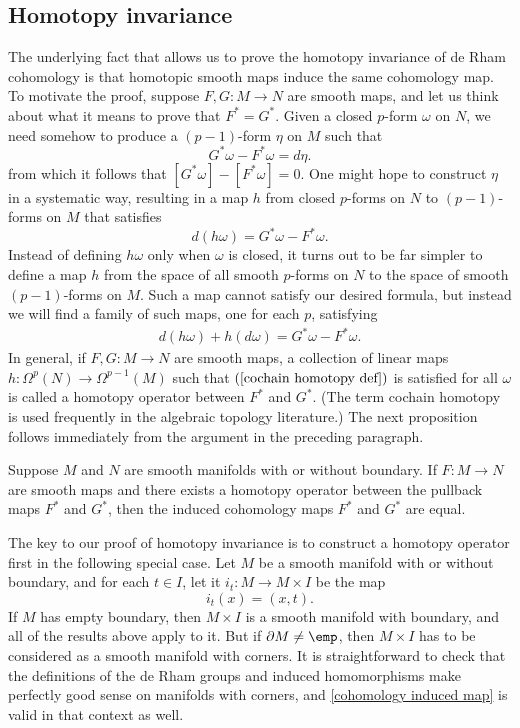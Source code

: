 \subsection{Homotopy invariance}
The underlying fact that allows us to prove the homotopy invariance of de Rham cohomology is that homotopic smooth maps induce the same cohomology map. To motivate the proof, suppose $F,G:M\to N$ are smooth maps, and let us think about what it means to prove that $F^*=G^*$. Given a closed $p$-form $\omega$ on $N$, we need somehow to produce a $(p-1)$-form $\eta$ on $M$ such that
\[G^*\omega-F^*\omega=d\eta.\]
from which it follows that $[G^*\omega]-[F^*\omega]=0$. One might hope to construct $\eta$ in a systematic way, resulting in a map $h$ from closed $p$-forms on $N$ to $(p-1)$-forms on $M$ that satisfies 
\[d(h\omega)=G^*\omega-F^*\omega.\]
Instead of defining $h\omega$ only when $\omega$ is closed, it turns out to be far simpler to define a map $h$ from the space of all smooth $p$-forms on $N$ to the space of smooth $(p-1)$-forms on $M$. Such a map cannot satisfy our desired formula, but instead we will find a family of such maps, one for each $p$, satisfying
\begin{align}\label{cochain homotopy def}
d(h\omega)+h(d\omega)=G^*\omega-F^*\omega.
\end{align}
In general, if $F,G:M\to N$ are smooth maps, a collection of linear maps $h:\Omega^p(N)\to\Omega^{p-1}(M)$ such that $(\ref{cochain homotopy def})$ is satisfied for all $\omega$ is called a homotopy operator between $F^*$ and $G^*$. (The term cochain homotopy is used frequently in the algebraic topology literature.) The next proposition follows immediately from the argument in the preceding paragraph.
\begin{proposition}
Suppose $M$ and $N$ are smooth manifolds with or without boundary. If $F:M\to N$ are smooth maps and there exists a homotopy operator between the pullback maps $F^*$ and $G^*$, then the induced cohomology maps $F^*$ and $G^*$ are equal.
\end{proposition}
The key to our proof of homotopy invariance is to construct a homotopy operator
first in the following special case. Let $M$ be a smooth manifold with or without boundary, and for each $t\in I$, let it $i_t:M\to M\times I$ be the map
\[i_t(x)=(x,t).\]
If $M$ has empty boundary, then $M\times I$ is a smooth manifold with boundary, and all of the results above apply to it. But if $\partial M\neq\emp$, then $M\times I$ has to be considered as a smooth manifold with corners. It is straightforward to check that the definitions of the de Rham groups and induced homomorphisms make perfectly good sense on manifolds with corners, and \cref{cohomology induced map} is valid in that context as well.
